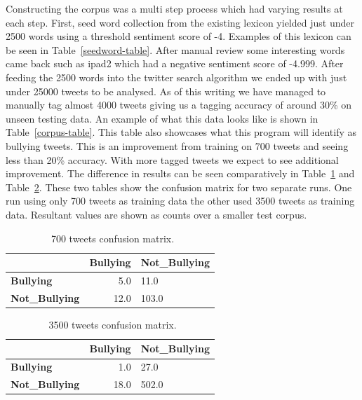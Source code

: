 \documentclass[11pt,letterpaper]{article}
\begin{document}
Constructing the corpus was a multi step process which had varying results at each step. First, seed word collection from the existing lexicon yielded just under 2500 words using a threshold sentiment score of -4. Examples of this lexicon can be seen in Table~\ref{seedword-table}. After manual review some interesting words came back such as ipad2 which had a negative sentiment score of -4.999. After feeding the 2500 words into the twitter search algorithm we ended up with just under 25000 tweets to be analysed. As of this writing we have managed to manually tag almost 4000 tweets giving us a tagging accuracy of around 30\% on unseen testing data. An example of what this data looks like is shown in Table~\ref{corpus-table}. This table also showcases what this program will identify as bullying tweets. This is an improvement from training on 700 tweets and seeing less than 20\% accuracy. With more tagged tweets we expect to see additional improvement. The difference in results can be seen comparatively in Table~\ref{tweet-table} and Table~\ref{tweet-table2}. These two tables show the confusion matrix for two separate runs. One run using only 700 tweets as training data the other used 3500 tweets as training data. Resultant values are shown as counts over a smaller test corpus.

\begin{table}
\begin{center}
\begin{tabular}{|l|rl|}
\hline
 & \bf Bullying & \bf Not\_Bullying \\ 
\hline

\bf Bullying & 5.0 & 11.0 \\
\bf Not\_Bullying & 12.0 & 103.0 \\

\hline
\end{tabular}
\end{center}
\caption{\label{tweet-table} ~700 tweets confusion matrix. }
\end{table}

\begin{table}
\begin{center}
\begin{tabular}{|l|rl|}
\hline
 & \bf Bullying & \bf Not\_Bullying \\ 
\hline

\bf Bullying & 1.0 & 27.0 \\
\bf Not\_Bullying & 18.0 & 502.0 \\

\hline
\end{tabular}
\end{center}
\caption{\label{tweet-table2} ~3500 tweets confusion matrix. }
\end{table}
\end{document}
